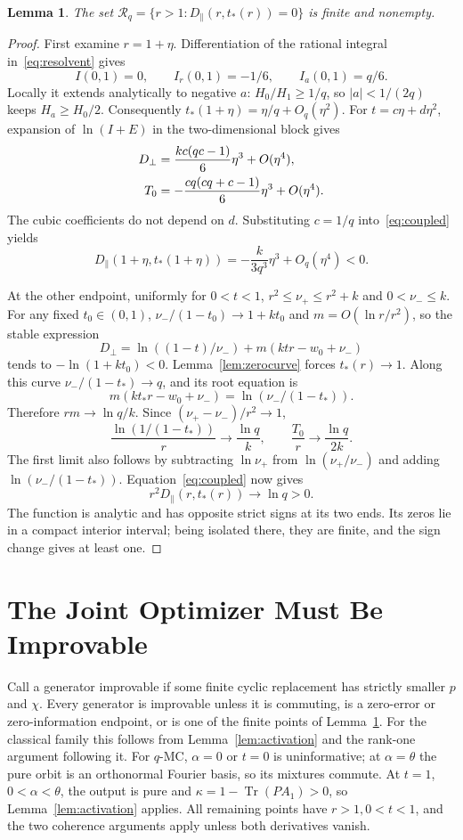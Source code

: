 \documentclass[12pt,letterpaper,onecolumn]{article}
\newtheorem{lemma}[theorem]{Lemma}
\theoremstyle{definition}
\theoremstyle{remark}
\DeclareMathOperator{\Tr}{Tr}
\begin{document}
\begin{lemma}\label{lem:finite}
The set
\(\mathcal R_q=\{r>1:D_\parallel(r,t_*(r))=0\}\) is finite and nonempty.
\end{lemma}
\begin{proof}
First examine \(r=1+\eta\). Differentiation of the rational integral in~\eqref{eq:resolvent} gives
\[
I(0,1)=0,\qquad I_r(0,1)=-1/6,\qquad I_a(0,1)=q/6.
\]
Locally it extends analytically to negative \(a\): \(H_0/H_1\ge1/q\), so \(|a|<1/(2q)\) keeps \(H_a\ge H_0/2\).
Consequently \(t_*(1+\eta)=\eta/q+O_q(\eta^2)\).
For \(t=c\eta+d\eta^2\), expansion of \(\ln(I+E)\) in the two-dimensional block gives
\begin{align}
D_\perp&=\frac{kc(qc-1)}6\eta^3+O(\eta^4),\notag\\
T_0&=-\frac{cq(cq+c-1)}6\eta^3+O(\eta^4).\label{eq:cubic}
\end{align}
The cubic coefficients do not depend on \(d\). Substituting \(c=1/q\) into~\eqref{eq:coupled} yields
\begin{equation}\label{eq:nearone}
D_\parallel(1+\eta,t_*(1+\eta))
=-\frac{k}{3q^3}\eta^3+O_q(\eta^4)<0.
\end{equation}

At the other endpoint, uniformly for \(0<t<1\),
\(r^2\le\nu_+\le r^2+k\) and \(0<\nu_-\le k\).
For any fixed \(t_0\in(0,1)\), \(\nu_-/(1-t_0)\to1+kt_0\) and \(m=O(\ln r/r^2)\), so the stable expression
\[
D_\perp=\ln((1-t)/\nu_-)+m(ktr-w_0+\nu_-)
\]
tends to \(-\ln(1+kt_0)<0\).
Lemma~\ref{lem:zerocurve} forces \(t_*(r)\to1\). Along this curve \(\nu_-/(1-t_*)\to q\), and its root equation is
\[
m(kt_*r-w_0+\nu_-)=\ln(\nu_-/(1-t_*)).
\]
Therefore \(rm\to\ln q/k\). Since \((\nu_+-\nu_-)/r^2\to1\),
\[
\frac{\ln(1/(1-t_*))}{r}\longrightarrow\frac{\ln q}{k},
\qquad \frac{T_0}{r}\longrightarrow\frac{\ln q}{2k}.
\]
The first limit also follows by subtracting \(\ln\nu_+\) from \(\ln(\nu_+/\nu_-)\) and adding \(\ln(\nu_-/(1-t_*))\).
Equation~\eqref{eq:coupled} now gives
\[
r^2D_\parallel(r,t_*(r))\longrightarrow\ln q>0.
\]
The function is analytic and has opposite strict signs at its two ends. Its zeros lie in a compact interior interval; being isolated there, they are finite, and the sign change gives at least one.
\end{proof}

\section{The Joint Optimizer Must Be Improvable}
Call a generator improvable if some finite cyclic replacement has strictly smaller \(p\) and \(\chi\). Every generator is improvable unless it is commuting, is a zero-error or zero-information endpoint, or is one of the finite points of Lemma~\ref{lem:finite}.
For the classical family this follows from Lemma~\ref{lem:activation} and the rank-one argument following it. For \(q\)-MC, \(\alpha=0\) or \(t=0\) is uninformative; at \(\alpha=\theta\) the pure orbit is an orthonormal Fourier basis, so its mixtures commute. At \(t=1\), \(0<\alpha<\theta\), the output is pure and
\(\kappa=1-\Tr(PA_1)>0\), so Lemma~\ref{lem:activation} applies. All remaining points have \(r>1,0<t<1\), and the two coherence arguments apply unless both derivatives vanish.
\end{document}

